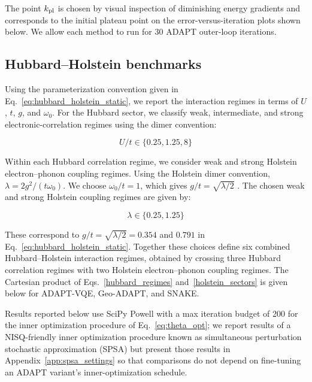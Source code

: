 \documentclass[
  reprint,
  amsmath,
  amssymb,
  aps,
  pra,
  nofootinbib,
  superscriptaddress,
  floatfix
]{revtex4-2}
\begin{document}
The point \(k_{\rm pl}\) is chosen by visual inspection of diminishing energy gradients and corresponds to the initial plateau point on the error-versus-iteration plots shown below. We allow each method to run for \(30\) ADAPT outer-loop iterations.



\subsection{Hubbard--Holstein benchmarks}
Using the parameterization convention given in Eq.~\eqref{eq:hubbard_holstein_static}, we report the interaction regimes in terms of \(U\), \(t\), \(g\), and \(\omega_0\).
For the Hubbard sector, we classify weak, intermediate, and strong electronic-correlation regimes using the dimer convention:

\begin{equation}
    U/t \in\{0.25,1.25,8\} \label{hubbard_regimes}
\end{equation}

Within each Hubbard correlation regime, we consider weak and strong Holstein electron--phonon coupling regimes. Using the Holstein dimer convention, \(\lambda=2g^2/(t\omega_0)\). We choose \(\omega_0/t=1\), which gives \(g/t=\sqrt{\lambda/2}\) \cite{Sakkinen2015HolsteinDimer}.
The chosen weak and strong Holstein coupling regimes are given by:

\begin{equation}
    \lambda\in\{0.25,1.25\} \label{holstein_sectors}
\end{equation}

These correspond to \(g/t=\sqrt{\lambda/2}=0.354\) and \(0.791\) in Eq.~\eqref{eq:hubbard_holstein_static}. Together these choices define six combined Hubbard--Holstein interaction regimes, obtained by crossing three Hubbard correlation regimes with two Holstein electron--phonon coupling regimes. The Cartesian product of Eqs.~\eqref{hubbard_regimes} and~\eqref{holstein_sectors} is given below for ADAPT-VQE, Geo-ADAPT, and SNAKE.


Results reported below use SciPy Powell with a max iteration budget of 200 for the inner optimization procedure of Eq.~\eqref{eq:theta_opt}; we report results of a NISQ-friendly inner optimization procedure known as simultaneous perturbation stochastic approximation (SPSA) but present those results in Appendix~\ref{app:spsa_settings} so that comparisons do not depend on fine-tuning an ADAPT variant's inner-optimization schedule. 
\end{document}
